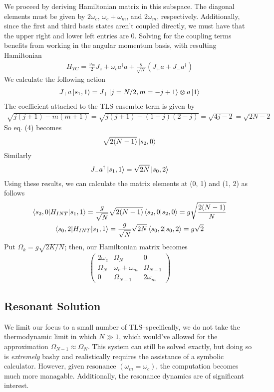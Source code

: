 \documentclass[10pt]{article}
\begin{document}
We proceed by deriving Hamiltonian matrix in this subspace. The diagonal elements must be given
by $2\omega_c$, $\omega_c + \omega_m$, and $2\omega_m$, respectively. Additionally, since the
first and third basis states aren't coupled directly, we must have that the upper right and lower
left entries are 0. Solving for the coupling terms benefits from working
in the angular momentum basis, with resulting Hamiltonian
\begin{gather}
    H_{TC} = \frac{\omega_m}{2} J_z + 
    \omega_c a^{\dag }a + 
    \frac{g}{\sqrt{N}} \left( J_{+}a + J_{-}a^{\dag } \right) 
\end{gather}
We calculate the following action
\begin{gather}
    J_{+}a \ket{s_1, 1} = J_{+}\ket{j = N / 2, m = -j + 1} 
    \otimes a\ket{1}
\end{gather}
The coefficient attached to the TLS ensemble term is given by 
\begin{gather*}
    \sqrt{j(j+1) - m(m+1)} = 
    \sqrt{j(j+1) - (1-j)(2-j)} = \sqrt{4j - 2} = \sqrt{2N - 2}   
\end{gather*}
So eq. (4) becomes
\begin{gather}
    \sqrt{2(N-1)} \ket{s_2, 0}  
\end{gather}
Similarly
\begin{gather}
    J_{-}a^{\dag } \ket{s_1, 1} =   
    \sqrt{2N} \ket{s_0, 2} 
\end{gather}
Using these results, we can calculate the matrix elements at (0, 1) and
(1, 2) as follows
\begin{gather}
    \braket{s_2, 0|H_{INT} | s_1, 1} = 
    \frac{g}{\sqrt{N}}\sqrt{2(N-1)} 
    \braket{s_2, 0|s_2, 0} = g\sqrt{\frac{2(N-1)}{N}} \\ 
    \braket{s_0, 2| H_{INT}| s_1, 1} = 
    \frac{g}{\sqrt{N}} \sqrt{2N}
    \braket{s_0, 2| s_0, 2} = g\sqrt{2}  
\end{gather}
Put $\Omega_k = g\sqrt{2K / N}$; then, our Hamiltonian matrix becomes
\begin{gather}
    \begin{pmatrix} 2 \omega_c & \Omega_{N} & 0 \\
        \Omega_{N} & \omega_c + \omega_m & \Omega_{N-1} \\
    0 & \Omega_{N-1} & 2\omega_m \end{pmatrix} 
\end{gather}

\subsection{Resonant Solution}
We limit our focus to a small number of TLS--specifically, we do not 
take the thermodynamic limit in which $N \gg 1$, which would've allowed
for the approximation $\Omega_{N-1} \approx \Omega_{N}$. This system 
can still be solved exactly, but doing so is \textit{extremely} bashy and
realistically requires the assistance of a symbolic calculator. However, 
given resonance $(\omega_m = \omega_c)$, the computation becomes much 
more managable. Additionally, the resonance dynamics are of significant
interest. 
\end{document}
